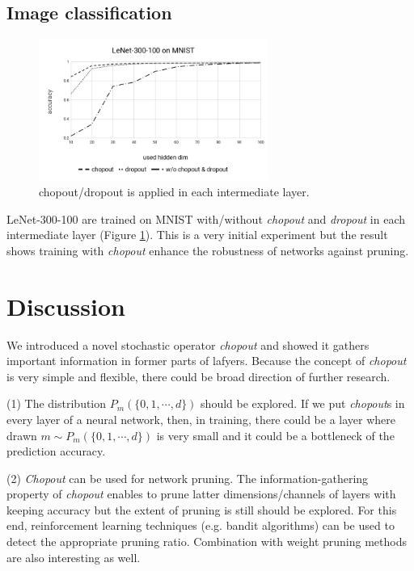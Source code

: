 \documentclass{article}
\begin{document}
    \subsection{Image classification}
    
    \begin{figure}
    \centering
    \includegraphics[clip, width=75mm]{lenet-300-100_mnist.png}
    \caption{chopout/dropout is applied in each intermediate layer.}
    \label{fig:lenet-300-100_mnist}
    \end{figure}
    
    LeNet-300-100 \cite{lecun1998gradient} are trained on MNIST with/without \textit{chopout} and \textit{dropout} in each intermediate layer (Figure \ref{fig:lenet-300-100_mnist}). 
    This is a very initial experiment but the result shows training with \textit{chopout} enhance the robustness of networks against pruning.
    
    \section{Discussion}
    We introduced a novel stochastic operator \textit{chopout} and showed it gathers important information in former parts of lafyers. Because the concept of \textit{chopout} is very simple and flexible, there could be broad direction of further research.

    (1) The distribution $P_m(\{0, 1, \cdots, d\})$ should be explored. If we put \textit{chopout}s in every layer of a neural network, then, in training, there could be a layer where drawn $m \sim P_m(\{0, 1, \cdots, d\})$ is very small and it could be a bottleneck of the prediction accuracy.
    
    (2) \textit{Chopout} can be used for network pruning. The information-gathering property of \textit{chopout} enables to prune latter dimensions/channels of layers with keeping accuracy but the extent of pruning is still should be explored. For this end, reinforcement learning techniques (e.g. bandit algorithms) can be used to detect the appropriate pruning ratio. Combination with weight pruning methods are also interesting as well.

    
    
    
        
    
    
    
    
\end{document}
